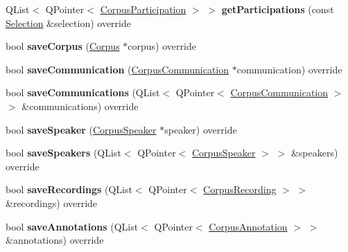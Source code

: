 \begin{DoxyCompactItemize}
Q\+List$<$ Q\+Pointer$<$ \hyperlink{class_corpus_participation}{Corpus\+Participation} $>$ $>$ {\bfseries get\+Participations} (const \hyperlink{class_metadata_datastore_1_1_selection}{Selection} \&selection) override
\item 
\mbox{\label{class_x_m_l_metadata_datastore_a035d1c9c9e0793348ec53fa7e23d4f17}} 
bool {\bfseries save\+Corpus} (\hyperlink{class_corpus}{Corpus} $\ast$corpus) override
\item 
\mbox{\label{class_x_m_l_metadata_datastore_a0f79a008d35a8fedbb56762bae11054a}} 
bool {\bfseries save\+Communication} (\hyperlink{class_corpus_communication}{Corpus\+Communication} $\ast$communication) override
\item 
\mbox{\label{class_x_m_l_metadata_datastore_aeef1a460d5df729353a37430745fc039}} 
bool {\bfseries save\+Communications} (Q\+List$<$ Q\+Pointer$<$ \hyperlink{class_corpus_communication}{Corpus\+Communication} $>$ $>$ \&communications) override
\item 
\mbox{\label{class_x_m_l_metadata_datastore_ad1561c54f37ad22cf24cedc06700660a}} 
bool {\bfseries save\+Speaker} (\hyperlink{class_corpus_speaker}{Corpus\+Speaker} $\ast$speaker) override
\item 
\mbox{\label{class_x_m_l_metadata_datastore_a07bd430e4e8869f38bd9e116e3905ac5}} 
bool {\bfseries save\+Speakers} (Q\+List$<$ Q\+Pointer$<$ \hyperlink{class_corpus_speaker}{Corpus\+Speaker} $>$ $>$ \&speakers) override
\item 
\mbox{\label{class_x_m_l_metadata_datastore_a9a11d6ad6f585d233061ae018549eb2b}} 
bool {\bfseries save\+Recordings} (Q\+List$<$ Q\+Pointer$<$ \hyperlink{class_corpus_recording}{Corpus\+Recording} $>$ $>$ \&recordings) override
\item 
\mbox{\label{class_x_m_l_metadata_datastore_a2cb7e3866eeb05a471ef8c4838ae580c}} 
bool {\bfseries save\+Annotations} (Q\+List$<$ Q\+Pointer$<$ \hyperlink{class_corpus_annotation}{Corpus\+Annotation} $>$ $>$ \&annotations) override
\item 

\end{DoxyCompactItemize}
